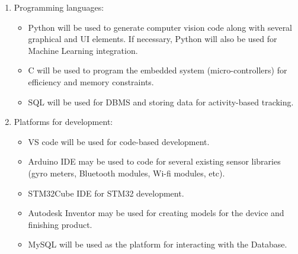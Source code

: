 \documentclass[12pt]{article}
\begin{document}
\begin{enumerate}
\item Programming languages:
\begin{itemize}
\item Python will be used to generate computer vision code along with several graphical and UI elements. If necessary, Python will also be used for Machine Learning integration.
\item C will be used to program the embedded system (micro-controllers) for efficiency and memory constraints.
\item SQL will be used for DBMS and storing data for activity-based tracking.
\end{itemize}
\item Platforms for development:
\begin{itemize}
\item VS code will be used for code-based development.
\item Arduino IDE may be used to code for several existing sensor libraries (gyro meters, Bluetooth modules, Wi-fi modules, etc).
\item STM32Cube IDE for STM32 development. 
\item Autodesk Inventor may be used for creating models for the device and finishing product.
\item MySQL will be used as the platform for interacting with the Database.\\\\
\end{itemize}


\end{enumerate}
\end{document}
